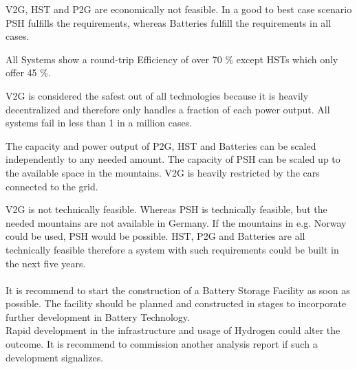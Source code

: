 \begin{parcolumns}[colwidths={1=2.5 cm, 2=10 cm, 3=2.5cm}]{3}
{\noindent V2G, HST and P2G are economically not feasible. In a good to best case scenario PSH fulfills the requirements, whereas Batteries fulfill the requirements in all cases.

\noindent All Systems show a round-trip Efficiency of over 70 $\%$ except HSTs which only offer 45 $\%$. 

\noindent V2G is considered the safest out of all technologies because it is heavily decentralized and therefore only handles a fraction of each power output. All systems fail in less than 1 in a million cases. 

\noindent The capacity and power output of P2G, HST and Batteries can be scaled independently to any needed amount. The capacity of PSH can be scaled up to the available space in the mountains. V2G is heavily restricted by the cars connected to the grid. 

\noindent V2G is not technically feasible. Whereas PSH is technically feasible, but the needed mountains are not available in Germany. If the mountains in e.g. Norway could be used, PSH would be possible. HST, P2G and Batteries are all technically feasible therefore a system with such requirements could be built in the next five years. \\ \\
\noindent
It is recommend to start the construction of a Battery Storage Facility as soon as possible. The facility should be planned and constructed in stages to incorporate further development in Battery Technology. \\
\noindent 
Rapid development in the infrastructure and usage of Hydrogen could alter the outcome. It is recommend to commission another analysis report if such a development signalizes. \\

}
\end{parcolumns}
